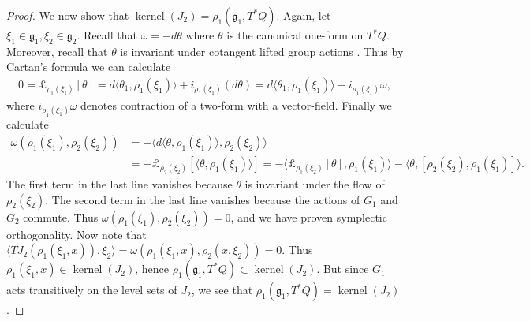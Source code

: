 \documentclass[12pt]{amsart}
\DeclareMathOperator{\kernel}{kernel}
\begin{document}
\begin{proof}
    We now show that $\kernel(J_2) = \rho_1(\mathfrak{g}_1,T^*Q)$.
    Again, let $\xi_1 \in \mathfrak{g}_1, \xi_2 \in \mathfrak{g}_2$.
    Recall that $\omega = - d \theta$ where $\theta$ is the canonical one-form on $T^*Q$.
    Moreover, recall that $\theta$ is invariant under cotangent lifted group actions \cite[Theorem 3.2.12]{FOM}.
    Thus by Cartan's formula \cite[Theorem 2.4.13(iv)]{FOM}we can calculate
    \begin{align*}
    	0 = \pounds_{\rho_1(\xi_1)} [ \theta] = d \langle \theta_1 , \rho_1(\xi_1) \rangle + i_{\rho_1(\xi_1)}(d\theta) = d \langle \theta_1 , \rho_1(\xi_1) \rangle - i_{\rho_1(\xi_1)} \omega, 
    \end{align*}
    where $i_{\rho_1(\xi_1)} \omega$ denotes contraction of a two-form with a vector-field.
    Finally we calculate
    \begin{align*}
    	\omega( \rho_1(\xi_1) , \rho_2(\xi_2) ) &=  -\langle d \langle \theta, \rho_1(\xi_1) \rangle ,  \rho_2(\xi_2) \rangle \\
		&= -\pounds_{\rho_2(\xi_2) }[ \langle \theta,\rho_1(\xi_1) \rangle] = - \langle \pounds_{\rho_1(\xi_2)}[\theta] , \rho_1(\xi_1) \rangle - \langle \theta , [\rho_2(\xi_2), \rho_1(\xi_1) ] \rangle.
    \end{align*}
    The first term in the last line vanishes because $\theta$ is invariant under the flow of $\rho_2(\xi_2)$.
    The second term in the last line vanishes because the actions of $G_1$ and $G_2$ commute.
    Thus $\omega(\rho_1(\xi_1) , \rho_2(\xi_2) ) = 0$,
    and we have proven symplectic orthogonality.
    Now note that
    $\langle TJ_2 ( \rho_1(\xi_1, x)), \xi_2 \rangle = \omega( \rho_1(\xi_1, x) ,\rho_2(x, \xi_2 )) = 0$.
    Thus $\rho_1(\xi_1 , x) \in \kernel( J_2)$, hence
    $\rho_1(\mathfrak{g}_1 ,T^*Q) \subset \kernel(J_2)$.
    But since $G_1$ acts transitively on the level sets of $J_2$, we see
    that $\rho_1(\mathfrak{g}_1, T^*Q) = \kernel( J_2)$.
  \end{proof}
\end{document}
